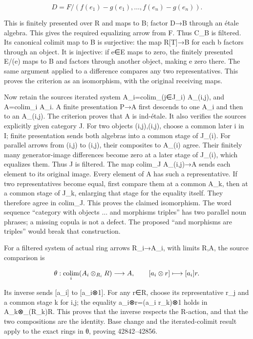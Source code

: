 \[
D=F/(f(e_1)-g(e_1),\ldots,f(e_n)-g(e_n)).
\]

This is finitely presented over R and maps to B; factor D→B through an étale algebra. This gives the required equalizing arrow from F. Thus C\_B is filtered. Its canonical colimit map to B is surjective: the map R{[}T{]}→B for each b factors through an object. It is injective: if e∈E maps to zero, the finitely presented E/(e) maps to B and factors through another object, making e zero there. The same argument applied to a difference compares any two representatives. This proves the criterion as an isomorphism, with the original receiving maps.

Now retain the source\textquotesingle s iterated system A\_i=colim\_(j∈J\_i) A\_(i,j), and A=colim\_i A\_i. A finite presentation P→A first descends to one A\_i and then to an A\_(i,j). The criterion proves that A is ind-étale. It also verifies the source\textquotesingle s explicitly given category J. For two objects (i,j),(i\textquotesingle,j\textquotesingle), choose a common later i\textquotesingle\textquotesingle{} in I; finite presentation sends both algebras into a common stage of J\_(i\textquotesingle\textquotesingle). For parallel arrows from (i,j) to (i\textquotesingle,j\textquotesingle), their composites to A\_(i\textquotesingle) agree. Their finitely many generator-image differences become zero at a later stage of J\_(i\textquotesingle), which equalizes them. Thus J is filtered. The map colim\_J A\_(i,j)→A sends each element to its original image. Every element of A has such a representative. If two representatives become equal, first compare them at a common A\_k, then at a common stage of J\_k, enlarging that stage for the equality itself. They therefore agree in colim\_J. This proves the claimed isomorphism. The word sequence ``category with objects ... and morphisms triples'' has two parallel noun phrases; a missing copula is not a defect. The proposed ``and morphisms are triples'' would break that construction.

For a filtered system of actual ring arrows R\_i→A\_i, with limits R,A, the source comparison is

\[
\theta:\mathop{\rm colim}_i(A_i\otimes_{R_i}R)\longrightarrow A,
\qquad [a_i\otimes r]\longmapsto [a_i]r.
\]

Its inverse sends {[}a\_i{]} to {[}a\_i⊗1{]}. For any r∈R, choose its representative r\_j and a common stage k for i,j; the equality a\_i⊗r=(a\_i r\_k)⊗1 holds in A\_k⊗\_(R\_k)R. This proves that the inverse respects the R-action, and that the two compositions are the identity. Base change and the iterated-colimit result apply to the exact rings in θ, proving 42842--42856.

